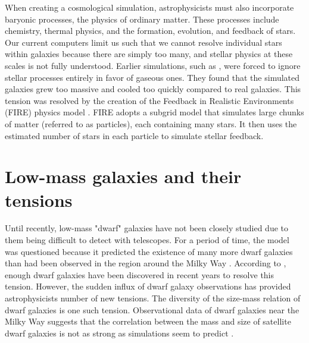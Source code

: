 When creating a cosmological simulation, astrophysicists must also incorporate baryonic processes, the physics of ordinary matter. These processes include chemistry, thermal physics, and the formation, evolution, and feedback of stars. Our current computers limit us such that we cannot resolve individual stars within galaxies \citep{feldmannFIREboxSimulatingGalaxies2022} because there are simply too many, and stellar physics at these scales is not fully understood. Earlier simulations, such as \cite{bournaudISMPropertiesHydrodynamic2010}, were forced to ignore stellar processes entirely in favor of gaseous ones. They found that the simulated galaxies grew too massive and cooled too quickly compared to real galaxies. This tension was resolved by the creation of the Feedback in Realistic Environments (FIRE) physics model \citep{hopkinsFIRE2SimulationsPhysics2018}. FIRE adopts a subgrid model that simulates large chunks of matter (referred to as particles), each containing many stars. It then uses the estimated number of stars in each particle to simulate stellar feedback. 

\section{Low-mass galaxies and their tensions}
Until recently, low-mass "dwarf" galaxies have not been closely studied due to them being difficult to detect with telescopes. For a period of time, the \lcdm\* model was questioned because it predicted the existence of many more dwarf galaxies than had been observed in the region around the Milky Way \citep{salesBaryonicSolutionsChallenges2022}. According to \cite{salesBaryonicSolutionsChallenges2022}, enough dwarf galaxies have been discovered in recent years to resolve this tension. However, the sudden influx of dwarf galaxy observations has provided astrophysicists number of new tensions. The diversity of the size-mass relation of dwarf galaxies is one such tension. Observational data of dwarf galaxies near the Milky Way suggests that the correlation between the mass and size of satellite dwarf galaxies is not as strong as simulations seem to predict \citep{salesBaryonicSolutionsChallenges2022}. 

